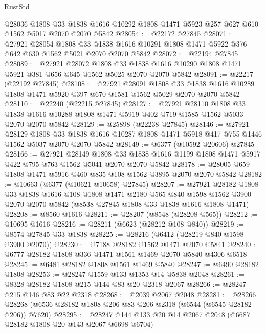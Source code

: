 \begin{lexlean}{RustStd}
\begin{coremodule}
    @28036
    @1808
    @33
    @1838
    @1616
    @10292
    @1808
    @1471
    @5923
    @257
    @627
    @610
    @1562
    @5017
    @2070
    @2070
    @5842
@28054 := @22172 @27845
@28071 := @27921
    @28054
    @1808
    @33
    @1838
    @1616
    @10291
    @1808
    @1471
    @5922
    @376
    @642
    @630
    @1562
    @5021
    @2070
    @2070
    @5842
@28072 := @22194 @27845
@28089 := @27921
    @28072
    @1808
    @33
    @1838
    @1616
    @10290
    @1808
    @1471
    @5921
    @381
    @656
    @645
    @1562
    @5025
    @2070
    @2070
    @5842
@28091 := @22217 (@22192 @27845)
@28108 := @27921
    @28091
    @1808
    @33
    @1838
    @1616
    @10289
    @1808
    @1471
    @5920
    @397
    @670
    @1581
    @1562
    @5029
    @2070
    @2070
    @5842
@28110 := @22240 (@22215 @27845)
@28127 := @27921
    @28110
    @1808
    @33
    @1838
    @1616
    @10288
    @1808
    @1471
    @5919
    @402
    @719
    @1585
    @1562
    @5033
    @2070
    @2070
    @5842
@28129 := @25898 (@22238 @27845)
@28146 := @27921
    @28129
    @1808
    @33
    @1838
    @1616
    @10287
    @1808
    @1471
    @5918
    @417
    @755
    @1446
    @1562
    @5037
    @2070
    @2070
    @5842
@28149 := @6377 (@10592 @20606) @27845
@28166 := @27921
    @28149
    @1808
    @33
    @1838
    @1616
    @1199
    @1808
    @1471
    @5917
    @422
    @795
    @763
    @1562
    @5041
    @2070
    @2070
    @5842
@28178 := @28005 @659 @1808 @1471 @5916 @460 @835 @108 @1562 @3895 @2070 @2070 @5842
@28182 := @10663 (@6377 (@10621 @10658) @27845)
@28207 := @27921
    @28182
    @1808
    @33
    @1838
    @1616
    @108
    @1808
    @1471
    @2180
    @565
    @840
    @1598
    @1562
    @3900
    @2070
    @2070
    @5842
    (@8538 @27845 @1808 @33 @1838 @1616 @1808 @1471)
@28208 := @8560 @1616
@28211 := @28207 (@8548 (@28208 @565))
@28212 := @10695 @1616
@28216 := @28211 (@6623 (@28212 @108 @840))
@28219 := @8574 @27845 @33 @1838
@28225 := @28216 (@6412 (@28219 @840 @1598 @3900 @2070))
@28230 := @7188 @28182 @1562 @1471 @2070 @5841
@28240 := @6777 @28182 @1808 @336 @1471 @1561 @1469 @2070 @5840 @4306 @6518
@28245 := @6481 @28182 @1808 @1561 @1469 @5840
@28247 := @6490 @28182 @1808
@28253 := @28247 @1559 @133 @1353 @14 @5838 @2048
@28261 := @8328 @28182 @1808 @215 @144 @83 @20 @2318 @2067
@28266 := @28247 @215 @146 @83 @22 @2318
@28268 := @2039 @2067 @2048
@28281 := @28266 @28268 (@6536 @28182 @1808 @206 @83 @206 @2318 (@6544 (@6545 @28182 @206)) @7620)
@28295 := @28247 @144 @133 @20 @14 @2067 @2048 (@6687 @28182 @1808 @20 @143 @2067 @6698 @6704)

\end{coremodule}
\end{lexlean}
